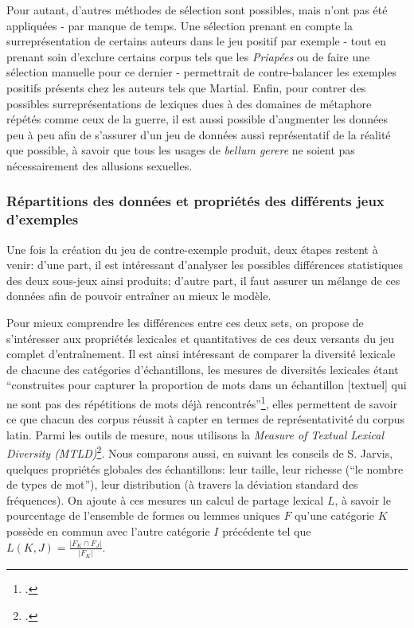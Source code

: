 Pour autant, d'autres méthodes de sélection sont possibles, mais n'ont pas été appliquées - par manque de temps. Une sélection prenant en compte la surreprésentation de certains auteurs dans le jeu positif par exemple - tout en prenant soin d'exclure certains corpus tels que les \textit{Priapées} ou de faire une sélection manuelle pour ce dernier - permettrait de contre-balancer les exemples positifs présents chez les auteurs tels que Martial. Enfin, pour contrer des possibles surreprésentations de lexiques dues à des domaines de métaphore répétés comme ceux de la guerre, il est aussi possible d'augmenter les données peu à peu afin de s'assurer d'un jeu de données aussi représentatif de la réalité que possible, à savoir que tous les usages de \textit{bellum gerere} ne soient pas nécessairement des allusions sexuelles.

\subsubsection{Répartitions des données et propriétés des différents jeux d'exemples}

Une fois la création du jeu de contre-exemple produit, deux étapes restent à venir: d'une part, il est intéressant d'analyser les possibles différences statistiques des deux sous-jeux ainsi produits; d'autre part, il faut assurer un mélange de ces données afin de pouvoir entraîner au mieux le modèle.

Pour mieux comprendre les différences entre ces deux sets, on propose de s'intéresser aux propriétés lexicales et quantitatives de ces deux versants du jeu complet d'entraînement. Il est ainsi intéressant de comparer la diversité lexicale de chacune des catégories d'échantillons, les mesures de diversités lexicales étant \enquote{construites pour capturer la proportion de mots dans un échantillon [textuel] qui ne sont pas des répétitions de mots déjà rencontrés}\footcite[p. 44]{jarvis_capturing_2019}, elles permettent de savoir ce que chacun des corpus réussit à capter en termes de représentativité du corpus latin. Parmi les outils de mesure, nous utilisons la \textit{Measure of Textual Lexical Diversity (MTLD)}\footcite{mccarthy_assessment_2005}. Nous comparons aussi, en suivant les conseils de S. Jarvis, quelques propriétés globales des échantillons: leur taille, leur richesse (\enquote{le nombre de types de mot}), leur distribution (à travers la déviation standard des fréquences). On ajoute à ces mesures un calcul de partage lexical $L$, à savoir le pourcentage de l'ensemble de formes ou lemmes uniques $F$ qu'une catégorie $K$ possède en commun avec l'autre catégorie $I$ précédente tel que $L(K, J) = \frac{|F_{K} \cap F_{J}|}{|F_{K}|}$. 

